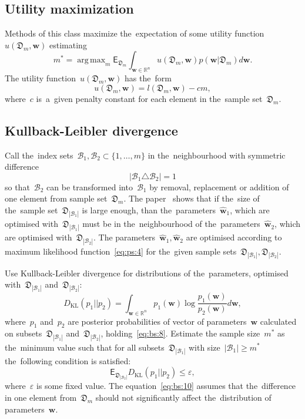 \documentclass[
11pt,%
tightenlines,%
twoside,%
onecolumn,%
nofloats,%
nobibnotes,%
nofootinbib,%
superscriptaddress,%
noshowpacs,%
centertags]%
{revtex4}
\DeclareMathOperator*{\argmax}{arg\,max}
\begin{document}
\subsection{Utility maximization}
Methods of this class maximize the~expectation of some utility function~$u\left(\mathfrak{D}_{m}, \mathbf{w}\right)$ estimating
\[
\label{eq:bs:6}
	m^* = \argmax_{m} \mathsf{E}_{\mathfrak{D}_m}\int_{\mathbf{w}\in\mathbb{R}^{n}}u\left(\mathfrak{D}_m, \mathbf{w}\right)p(\mathbf{w}|\mathfrak{D}_m)d\mathbf{w}.
\]
The utility function~$u\left(\mathfrak{D}_{m}, \mathbf{w}\right)$ has the~form
\[
\label{eq:bs:7}
	u\left(\mathfrak{D}_m, \mathbf{w}\right) = l\left(\mathfrak{D}_m, \mathbf{w}\right) - cm,
\]
 where~$c$ is~a~given penalty constant for each element in the~sample set~$\mathfrak{D}_m$. 
	 
\subsection{Kullback-Leibler divergence}
Call the~index sets~$\mathcal{B}_1,\mathcal{B}_2 \subset \{1,\dots,m\}$ in the~neighbourhood with symmetric difference
\[
\label{eq:bs:8}
	\left|\mathcal{B}_1 \triangle \mathcal{B}_2\right| = 1
\]
so that~$\mathcal{B}_2$ can be transformed into~$\mathcal{B}_1$ by removal, replacement or addition of one element from sample set~$\mathfrak{D}_m$. The paper~\cite{motrenko2014} shows that if the~size of the~sample set~$\mathfrak{D}_{|\mathcal{B}_1|}$ is large enough, than the~parameters~$\hat{\mathbf{w}}_1$, which are optimised with~$\mathfrak{D}_{|\mathcal{B}_1|}$ must be in the~neighbourhood of the~parameters~$\hat{\mathbf{w}}_2$, which are optimised with~$\mathfrak{D}_{|\mathcal{B}_2|}$. The parameters~$\hat{\mathbf{w}}_1, \hat{\mathbf{w}}_2$ are optimised according to maximum likelihood function~\eqref{eq:ps:4} for the~given sample sets~$\mathfrak{D}_{|\mathcal{B}_1|}, \mathfrak{D}_{|\mathcal{B}_2|}$.
	 
Use Kullback-Leibler divergence for distributions of the~parameters, optimised with~$\mathfrak{D}_{|\mathcal{B}_1|}$ and~$\mathfrak{D}_{|\mathcal{B}_2|}$:
\[
\label{eq:bs:9}
	D_\text{KL}\left(p_1 || p_2\right) = \int_{\mathbf{w}\in\mathbb{R}^{n}}p_1(\mathbf{w})\log\frac{p_1(\mathbf{w})}{p_2(\mathbf{w})}d\mathbf{w},
\]
where~$p_1$ and~$p_2$ are posterior probabilities of vector of parameters~$\mathbf{w}$ calculated on subsets~$\mathfrak{D}_{|\mathcal{B}_1|}$ and~$\mathfrak{D}_{|\mathcal{B}_2|}$, holding~\eqref{eq:bs:8}.
Estimate the sample size~$m^*$ as the~minimum value such that for all subsets~$\mathfrak{D}_{|\mathcal{B}_1|}$ with size~$|\mathcal{B}_1|\geq m^*$ the~following condition is satisfied:
\[
\label{eq:bs:10}
	\mathsf{E}_{\mathfrak{D}_{|\mathcal{B}_2|}}D_\text{KL}\left(p_1 || p_2\right) \leq \varepsilon,
\]
where~$\varepsilon$ is some fixed value. The equation~\eqref{eq:bs:10} assumes that the~difference in one element from~$\mathfrak{D}_m$ should not significantly affect the~distribution of parameters~$\mathbf{w}$. 
\end{document}
